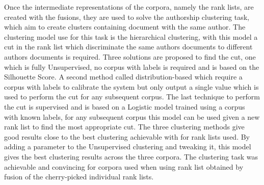 Once the intermediate representations of the corpora, namely the rank lists, are created with the fusions, they are used to solve the authorship clustering task, which aim to create clusters containing document with the same author.
The clustering model use for this task is the hierarchical clustering, with this model a cut in the rank list which discriminate the same authors documents to different authors documents is required.
Three solutions are proposed to find the cut, one which is fully Unsupervised, no corpus with labels is required and is based on the Silhouette Score.
A second method called distribution-based which require a corpus with labels to calibrate the system but only output a single value which is used to perform the cut for any subsequent corpus.
The last technique to perform the cut is supervised and is based on a Logistic model trained using a corpus with known labels, for any subsequent corpus this model can be used given a new rank list to find the most appropriate cut.
The three clustering methods give good results close to the best clustering achievable with for rank lists used.
By adding a parameter to the Unsupervised clustering and tweaking it, this model gives the best clustering results across the three corpora.
The clustering task was achievable and convincing for corpora used when using rank list obtained by fusion of the cherry-picked individual rank lists.
